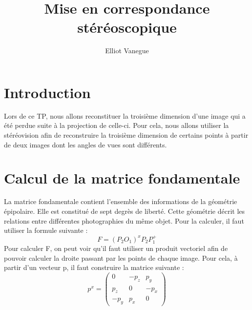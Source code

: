 \documentclass[a4paper,10pt]{article}
\title{Mise en correspondance stéréoscopique}
\author{Elliot Vanegue}
\begin{document}
\maketitle

\section{Introduction}
Lors de ce TP, nous allons reconstituer la troisième dimension d'une image
qui a été perdue suite à la projection de celle-ci. Pour cela, nous allons 
utiliser la stéréovision afin de reconstruire la troisième dimension de certains points à
partir de deux images dont les angles de vues sont différents.

\section{Calcul de la matrice fondamentale}
La matrice fondamentale contient l'ensemble des informations de la géométrie épipolaire.
Elle est constitué de sept degrès de liberté. Cette géométrie décrit les relations entre
différentes photographies du même objet. Pour la calculer, il faut utiliser la formule suivante :
\begin{equation}
 F=(P_2O_1)^xP_2P^+_1
 \label{fondamentale}
\end{equation}
Pour calculer F, on peut voir qu'il faut utiliser un produit vectoriel afin de 
pouvoir calculer la droite passant par les points de chaque image. Pour cela,
à partir d'un vecteur p, il faut construire la matrice suivante :
\begin{equation}
 p^x=\begin{pmatrix}
  0 & -p_z & p_y\\
  p_z & 0 & -p_x\\
  -p_y & p_x & 0
 \end{pmatrix}
 \label{vectoriel}
\end{equation}
\end{document}
